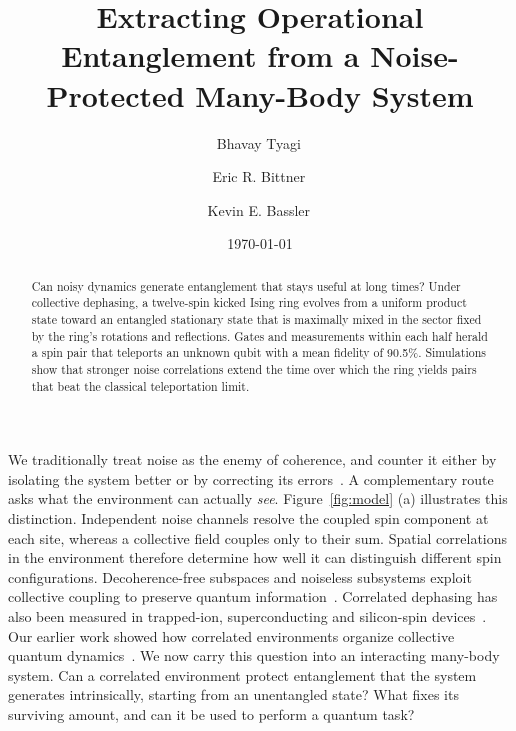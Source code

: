 \documentclass[aps,prl,reprint,amsmath,amssymb,floatfix,superscriptaddress]{revtex4-2}
\begin{document}
\title{Extracting Operational Entanglement from a Noise-Protected Many-Body System}
\author{Bhavay Tyagi\texorpdfstring{\,}{}}
\author{Eric R. Bittner\texorpdfstring{\,}{}}
\author{Kevin E. Bassler\texorpdfstring{\,}{}}
\date{\today}
\begin{abstract}
Can noisy dynamics generate entanglement that stays useful at long times? Under collective dephasing, a twelve-spin kicked Ising ring evolves from a uniform product state toward an entangled stationary state that is maximally mixed in the sector fixed by the ring’s rotations and reflections. Gates and measurements within each half herald a spin pair that teleports an unknown qubit with a mean fidelity of 90.5\%. Simulations show that stronger noise correlations extend the time over which the ring yields pairs that beat the classical teleportation limit.
\end{abstract}
\maketitle

We traditionally treat noise as the enemy of coherence, and counter it either by isolating the system better or by correcting its errors~\cite{Acharya2023}. A complementary route asks what the environment can actually \emph{see}. Figure~\ref{fig:model} (a) illustrates this distinction. Independent noise channels resolve the coupled spin component at each site, whereas a collective field couples only to their sum. Spatial correlations in the environment therefore determine how well it can distinguish different spin configurations. Decoherence-free subspaces and noiseless subsystems exploit collective coupling to preserve quantum information~\cite{Zanardi1997,Lidar1998,Knill2000}. Correlated dephasing has also been measured in trapped-ion, superconducting and silicon-spin devices~\cite{Monz2011,vonLupke2020,Yoneda2023}. Our earlier work showed how correlated environments organize collective quantum dynamics~\cite{Tyagi2024,Bittner2025jcp,Bittner2026graph}. We now carry this question into an interacting many-body system. Can a correlated environment protect entanglement that the system generates intrinsically, starting from an unentangled state? What fixes its surviving amount, and can it be used to perform a quantum task?
\end{document}
